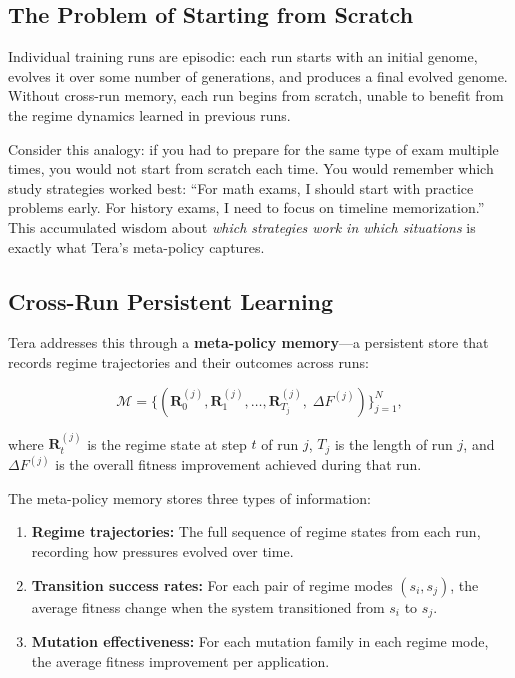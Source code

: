 \subsection{The Problem of Starting from Scratch}

Individual training runs are episodic: each run starts with an initial genome, evolves it over some number of generations, and produces a final evolved genome. Without cross-run memory, each run begins from scratch, unable to benefit from the regime dynamics learned in previous runs.

Consider this analogy: if you had to prepare for the same type of exam multiple times, you would not start from scratch each time. You would remember which study strategies worked best: ``For math exams, I should start with practice problems early. For history exams, I need to focus on timeline memorization.'' This accumulated wisdom about \emph{which strategies work in which situations} is exactly what Tera's meta-policy captures.

\subsection{Cross-Run Persistent Learning}

Tera addresses this through a \textbf{meta-policy memory}---a persistent store that records regime trajectories and their outcomes across runs:

\begin{equation}
\mathcal{M} = \bigl\{(\mathbf{R}_0^{(j)}, \mathbf{R}_1^{(j)}, \ldots, \mathbf{R}_{T_j}^{(j)},\; \Delta F^{(j)})\bigr\}_{j=1}^{N},
\label{eq:meta-memory}
\end{equation}

where $\mathbf{R}_t^{(j)}$ is the regime state at step $t$ of run $j$, $T_j$ is the length of run $j$, and $\Delta F^{(j)}$ is the overall fitness improvement achieved during that run.

The meta-policy memory stores three types of information:

\begin{enumerate}[leftmargin=1.8em]
  \item \textbf{Regime trajectories:} The full sequence of regime states from each run, recording how pressures evolved over time.
  \item \textbf{Transition success rates:} For each pair of regime modes $(s_i, s_j)$, the average fitness change when the system transitioned from $s_i$ to $s_j$.
  \item \textbf{Mutation effectiveness:} For each mutation family in each regime mode, the average fitness improvement per application.
\end{enumerate}

